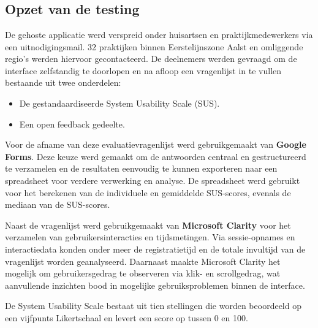 \chapter{}%
\label{ch:gebruikerstesting}

\section{Opzet van de testing}
\label{sec:opzet}

De gehoste applicatie werd verspreid onder huisartsen en praktijkmedewerkers via een uitnodigingsmail. 
32 praktijken binnen Eerstelijnszone Aalst en omliggende regio's werden hiervoor gecontacteerd.
De deelnemers werden gevraagd om de interface zelfstandig te doorlopen en na afloop een vragenlijst in te vullen bestaande uit twee onderdelen:

\begin{itemize}
    \item De gestandaardiseerde System Usability Scale (SUS).
    \item Een open feedback gedeelte.
\end{itemize}

Voor de afname van deze evaluatievragenlijst werd gebruikgemaakt van \textbf{Google Forms}. 
Deze keuze werd gemaakt om de antwoorden centraal en gestructureerd te verzamelen en de resultaten eenvoudig te kunnen exporteren naar een spreadsheet voor verdere verwerking en analyse. 
De spreadsheet werd gebruikt voor het berekenen van de individuele en gemiddelde SUS-scores, evenals de mediaan van de SUS-scores. 
\medskip

Naast de vragenlijst werd gebruikgemaakt van \textbf{Microsoft Clarity} voor het verzamelen van gebruikersinteracties en tijdsmetingen. 
Via sessie-opnames en interactiedata konden onder meer de registratietijd en de totale invultijd van de vragenlijst worden geanalyseerd. 
Daarnaast maakte Microsoft Clarity het mogelijk om gebruikersgedrag te observeren via klik- en scrollgedrag, wat aanvullende inzichten bood in mogelijke gebruiksproblemen binnen de interface.
\medskip

De System Usability Scale bestaat uit tien stellingen die worden beoordeeld op een vijfpunts Likertschaal en levert een score op tussen 0 en 100.

